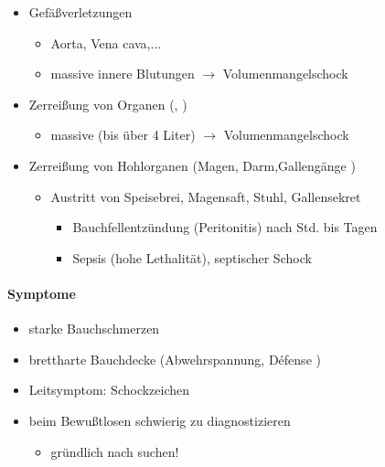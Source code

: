 \begin{itemize}
    \item Gef\"a{\ss}verletzungen
    \begin{itemize}
        \item Aorta, Vena cava,...
        \item massive innere Blutungen ${\rightarrow}$ Volumenmangelschock
    \end{itemize}
    \item Zerrei{\ss}ung  von Organen (,
    )
    \begin{itemize}
        \item massive  (bis über 4 Liter) ${\rightarrow}$
        Volumenmangelschock
    \end{itemize}
    \item Zerrei{\ss}ung  von Hohlorganen (Magen, Darm,Galleng\"ange )
    \begin{itemize}
        \item Austritt von Speisebrei, Magensaft, Stuhl, Gallensekret
        \begin{itemize}
            \item Bauchfellentz\"undung (Peritonitis) nach Std. bis  Tagen
            \item Sepsis (hohe Lethalit\"at), septischer Schock
        \end{itemize}
    \end{itemize}
\end{itemize}

\paragraph{Symptome}

\begin{itemize}
    \item starke  Bauchschmerzen
    \item brettharte  Bauchdecke  (Abwehrspannung, D\'efense )
    \item Leitsymptom: Schockzeichen
    \item beim Bewu{\ss}tlosen schwierig zu  diagnostizieren
    \begin{itemize}
        \item gr\"undlich nach 
        suchen!
    \end{itemize}
\end{itemize}



